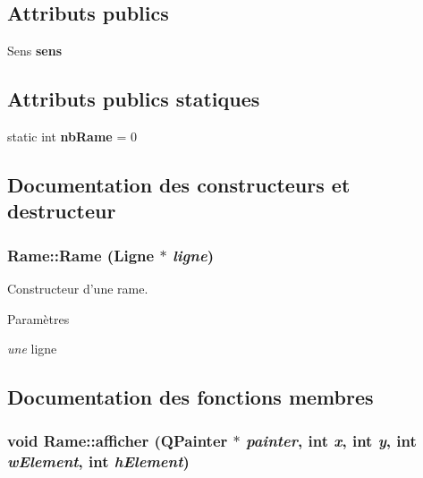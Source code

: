 \subsection*{Attributs publics}
\begin{DoxyCompactItemize}
\item 
\hypertarget{classRame_a525bea4947e6fcf110902fafdd380cf8}{
Sens {\bfseries sens}}
\label{classRame_a525bea4947e6fcf110902fafdd380cf8}

\end{DoxyCompactItemize}
\subsection*{Attributs publics statiques}
\begin{DoxyCompactItemize}
\item 
\hypertarget{classRame_a55df3add73446e18b84b6fca24a191c3}{
static int {\bfseries nbRame} = 0}
\label{classRame_a55df3add73446e18b84b6fca24a191c3}

\end{DoxyCompactItemize}


\subsection{Documentation des constructeurs et destructeur}
\hypertarget{classRame_a8066c138d427e7ae1236a563cf118c9a}{
\subsubsection[{Rame}]{\setlength{\rightskip}{0pt plus 5cm}Rame::Rame ({\bf Ligne} $\ast$ {\em ligne})}}
\label{classRame_a8066c138d427e7ae1236a563cf118c9a}


Constructeur d'une rame. 


\begin{DoxyParams}{Paramètres}
\item[{\em une}]ligne \end{DoxyParams}


\subsection{Documentation des fonctions membres}
\hypertarget{classRame_ae17128baab9f80372d1a1b6cd94ca2cd}{
\subsubsection[{afficher}]{\setlength{\rightskip}{0pt plus 5cm}void Rame::afficher (QPainter $\ast$ {\em painter}, \/  int {\em x}, \/  int {\em y}, \/  int {\em wElement}, \/  int {\em hElement})}}
\label{classRame_ae17128baab9f80372d1a1b6cd94ca2cd}


